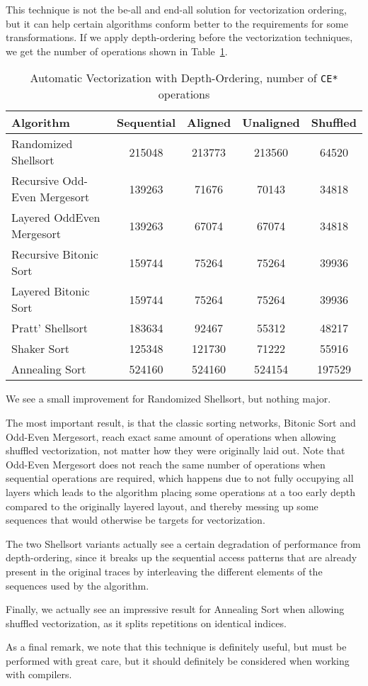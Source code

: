 This technique is not the be-all and end-all solution for vectorization ordering, but it can help certain algorithms conform better to the requirements for some transformations. If we apply depth-ordering before the vectorization techniques, we get the number of operations shown in Table~\ref{tab:AutoVectorizaionLayered}.

\begin{table}[!ht]
\begin{tabular}{|l c c c c|}
\hline
Algorithm & Sequential & Aligned & Unaligned & Shuffled \\
\hline
Randomized Shellsort & 215048 & 213773 & 213560 & 64520\\

Recursive Odd-Even Mergesort & 139263 & 71676 & 70143 & 34818\\

Layered OddEven Mergesort & 139263 & 67074 & 67074 & 34818\\

Recursive Bitonic Sort & 159744 & 75264 & 75264 & 39936\\

Layered Bitonic Sort & 159744 & 75264 & 75264 & 39936\\

Pratt' Shellsort & 183634 & 92467 & 55312 & 48217\\

Shaker Sort & 125348 & 121730 & 71222 & 55916\\

Annealing Sort & 524160 & 524160 & 524154 & 197529\\
\hline
\end{tabular}
\caption{Automatic Vectorization with Depth-Ordering, number of \texttt{CE*} operations}
\label{tab:AutoVectorizaionLayered}
\end{table}

We see a small improvement for Randomized Shellsort, but nothing major.

The most important result, is that the classic sorting networks, Bitonic Sort and Odd-Even Mergesort, reach exact same amount of operations when allowing shuffled vectorization, not matter how they were originally laid out. Note that Odd-Even Mergesort does not reach the same number of operations when sequential operations are required, which happens due to not fully occupying all layers which leads to the algorithm placing some operations at a too early depth compared to the originally layered layout, and thereby messing up some sequences that would otherwise be targets for vectorization. 

The two Shellsort variants actually see a certain degradation of performance from depth-ordering, since it breaks up the sequential access patterns that are already present in the original traces by interleaving the different elements of the sequences used by the algorithm. 

Finally, we actually see an impressive result for Annealing Sort when allowing shuffled vectorization, as it splits repetitions on identical indices.

As a final remark, we note that this technique is definitely useful, but must be performed with great care, but it should definitely be considered when working with compilers.